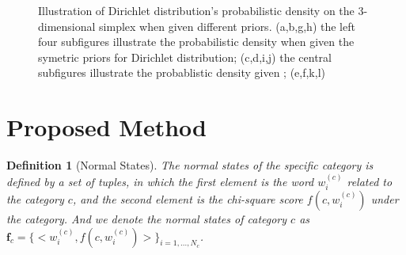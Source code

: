 \documentclass[conference,compsoc]{IEEEtran}
\newtheorem{rmk}{Definition}%
\begin{document}
\begin{figure}[ht]
{        }
        \hspace{1in}
        \caption{Illustration of Dirichlet distribution's probabilistic density on the 3-dimensional simplex when given different priors. (a,b,g,h) the left four subfigures illustrate the probabilistic density when given the symetric priors for Dirichlet distribution; (c,d,i,j) the central subfigures illustrate the probablistic density given ; (e,f,k,l) }
\end{figure}



\section{Proposed Method}
\begin{rmk}[Normal States] 
The normal states of the specific category is defined by a set of tuples, in which the first element is the word \(w^{(c)}_i\) related to the category \(c\), and the second element is the chi-square score \(f(c,w^{(c)}_{i})\) under the category. And we denote the normal states of category \(c\) as \(\bm{f}_c=\{<w^{(c)}_i,f(c,w^{(c)}_{i})>\}_{i=1,...,N_c}\).
\end{rmk}
\end{document}
